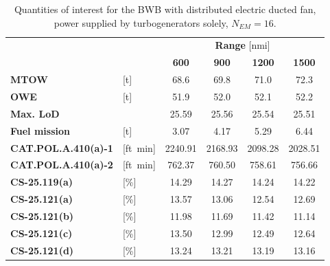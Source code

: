 \begin{table}[!h]
	\centering
	\begin{tabular}{l l c c c c}
		\cline{3-6}
		& & \multicolumn{4}{c}{\textbf{Range} [nmi]} \\
		& & \textbf{600} & \textbf{900} & \textbf{1200} & \textbf{1500} \\
		\hline
		\textbf{MTOW} & [\si{\tonne}] & 68.6 & 69.8 & 71.0 & 72.3 \\
		\textbf{OWE} & [\si{\tonne}] & 51.9 & 52.0 & 52.1 & 52.2 \\
		\textbf{Max. LoD} & & 25.59 & 25.56 & 25.54 & 25.51  \\
		\textbf{Fuel mission} & [\si{\tonne}] & 3.07 & 4.17 & 5.29 & 6.44 \\
		\hline
		\textbf{CAT.POL.A.410(a)-1} & [ft\si{\per\minute}] & 2240.91 & 2168.93 & 2098.28 & 2028.51 \\
		\textbf{CAT.POL.A.410(a)-2} & [ft\si{\per\minute}] & 762.37 & 760.50 & 758.61 & 756.66 \\
		\textbf{CS-25.119(a)} & [\%] & 14.29 & 14.27 & 14.24 & 14.22 \\
		\textbf{CS-25.121(a)} & [\%] & 13.57 & 13.06 & 12.54 & 12.69 \\
		\textbf{CS-25.121(b)} & [\%] & 11.98 & 11.69 & 11.42 & 11.14 \\
		\textbf{CS-25.121(c)} & [\%] & 13.50 & 12.99 & 12.49 & 12.64 \\
		\textbf{CS-25.121(d)} & [\%] & 13.24 & 13.21 & 13.19 & 13.16 \\
		\hline
	\end{tabular}
	\caption{Quantities of interest for the BWB with distributed electric ducted fan, power supplied by turbogenerators solely, $N_{EM}=16$.}
	\label{tab:bwb_hybrid_dep_gen_optim_res_n16}
\end{table}

